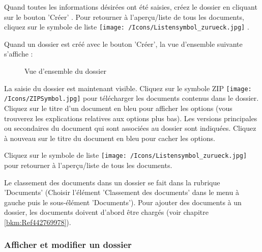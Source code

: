 Quand toutes les informations désirées ont été saisies, créez le dossier en cliquant sur le bouton 'Créer' . Pour retourner à l'aperçu/liste de tous les documents, cliquez sur le symbole de liste \texttt{[image: /Icons/Listensymbol\_zurueck.jpg]} .

\vspace{\baselineskip}

Quand un dossier est créé avec le bouton 'Créer', la vue d'ensemble suivante s'affiche :

\begin{figure}[H]
\caption{Vue d'ensemble du dossier}
\end{figure}

La saisie du dossier est maintenant visible. Cliquez sur le symbole ZIP \texttt{[image: /Icons/ZIPSymbol.jpg]}  pour télécharger les documents contenus dans le dossier. Cliquez sur le titre d'un document en bleu  pour afficher les options (vous trouverez les explications relatives aux options plus bas). Les versions principales ou secondaires du document qui sont associées au dossier sont indiquées. Cliquez à nouveau sur le titre du document en bleu pour cacher les options.

Cliquez sur le symbole de liste \texttt{[image: /Icons/Listensymbol\_zurueck.jpg]}  pour retourner à l'aperçu/liste de tous les documents.

\vspace{\baselineskip}

Le classement des documents dans un dossier se fait dans la rubrique 'Documents' (Choisir l'élément 'Classement des documents' dans le menu à gauche puis le sous-élément 'Documents'). Pour ajouter des documents à un dossier, les documents doivent d'abord être chargés (voir chapitre \ref{bkm:Ref442769978}).

\subsubsection{Afficher et modifier un dossier}

